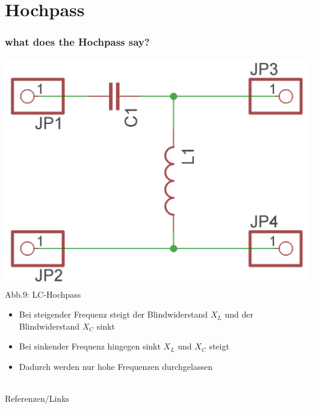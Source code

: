 \section*{Hochpass}
\begin{frame}
\frametitle{what does the Hochpass say?}
\begin{center}
	\includegraphics[scale=1.2]{e07/LC-Hochpass.png}\\
	Abb.9: LC-Hochpass
\end{center}
\begin{itemize}
	\item Bei steigender Frequenz steigt der Blindwiderstand $X_L$ und der Blindwiderstand $X_C$ sinkt
	\item Bei sinkender Frequenz hingegen sinkt $X_L$ und $X_C$ steigt
	\item Dadurch werden nur hohe Frequenzen durchgelassen 
\end{itemize}
\end{frame}

\renewcommand{\refname}{Referenzen}

\hypertarget{refs}{}
\textcolor{white}{} \\ %
\Large Referenzen/Links
\footnotesize


